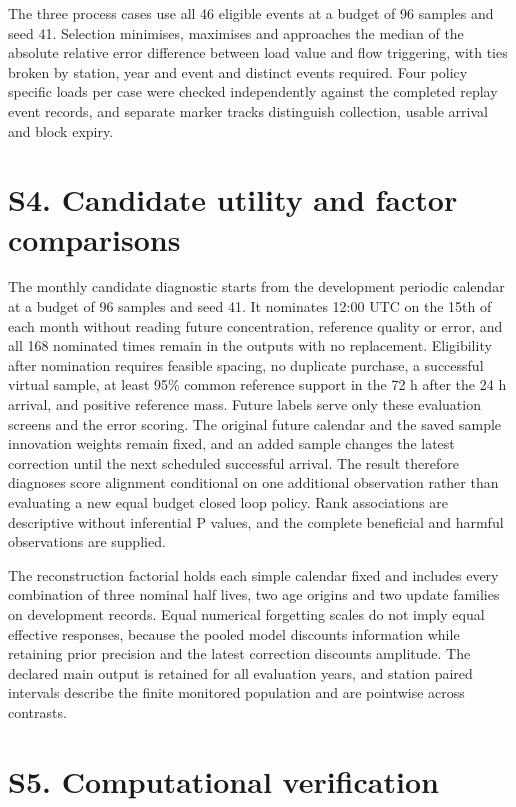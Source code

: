 \documentclass[lineno,pdflatex,sn-apa]{sn-jnl}%
\theoremstyle{thmstyleone}%
\theoremstyle{thmstyletwo}%
\theoremstyle{thmstylethree}%
\begin{document}
The three process cases use all 46 eligible events at a budget of 96 samples and seed 41. Selection minimises, maximises and approaches the median of the absolute relative error difference between load value and flow triggering, with ties broken by station, year and event and distinct events required. Four policy specific loads per case were checked independently against the completed replay event records, and separate marker tracks distinguish collection, usable arrival and block expiry.

\section*{S4. Candidate utility and factor comparisons}

The monthly candidate diagnostic starts from the development periodic calendar at a budget of 96 samples and seed 41. It nominates 12:00 UTC on the 15th of each month without reading future concentration, reference quality or error, and all 168 nominated times remain in the outputs with no replacement. Eligibility after nomination requires feasible spacing, no duplicate purchase, a successful virtual sample, at least 95\% common reference support in the 72 h after the 24 h arrival, and positive reference mass. Future labels serve only these evaluation screens and the error scoring. The original future calendar and the saved sample innovation weights remain fixed, and an added sample changes the latest correction until the next scheduled successful arrival. The result therefore diagnoses score alignment conditional on one additional observation rather than evaluating a new equal budget closed loop policy. Rank associations are descriptive without inferential P values, and the complete beneficial and harmful observations are supplied.

The reconstruction factorial holds each simple calendar fixed and includes every combination of three nominal half lives, two age origins and two update families on development records. Equal numerical forgetting scales do not imply equal effective responses, because the pooled model discounts information while retaining prior precision and the latest correction discounts amplitude. The declared main output is retained for all evaluation years, and station paired intervals describe the finite monitored population and are pointwise across contrasts.

\section*{S5. Computational verification}
\end{document}
